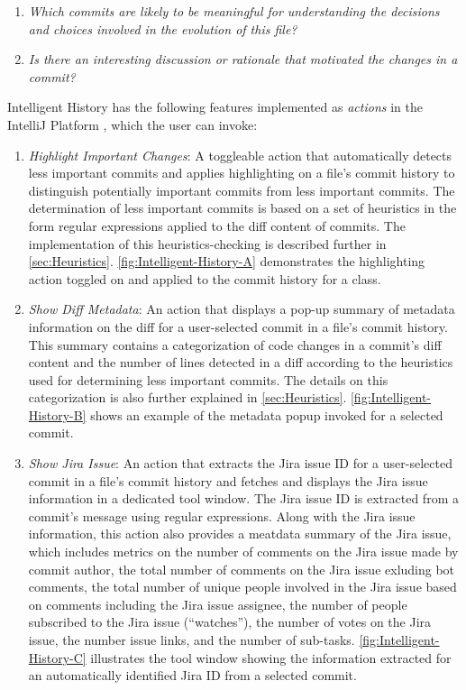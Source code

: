 \begin{enumerate}[label={(\arabic*)}]
    \item \textit{Which commits are likely to be meaningful for understanding the decisions and choices involved in the evolution of this file?}
    \item \textit{Is there an interesting discussion or rationale that motivated the changes in a commit?}
\end{enumerate}

Intelligent History has the following features implemented as \emph{actions} in the IntelliJ Platform , which the user can invoke:

\begin{enumerate}[label=(\Alph*)]
    \item \textit{Highlight Important Changes}: A toggleable action that automatically detects less important commits and applies highlighting on a file's commit history to distinguish potentially important commits from less important commits. The determination of less important commits is based on a set of heuristics in the form regular expressions applied to the diff content of commits. The implementation of this heuristics-checking is described further in \autoref{sec:Heuristics}. \autoref{fig:Intelligent-History-A} demonstrates the highlighting action toggled on and applied to the commit history for a class.
    \item \textit{Show Diff Metadata}: An action that displays a pop-up summary of metadata information on the diff for a user-selected commit in a file's commit history. This summary contains a categorization of code changes in a commit's diff content and the number of lines detected in a diff according to the heuristics used for determining less important commits. The details on this categorization is also further explained in \autoref{sec:Heuristics}. \autoref{fig:Intelligent-History-B} shows an example of the metadata popup invoked for a selected commit.
    \item \textit{Show Jira Issue}: An action that extracts the Jira issue ID for a user-selected commit in a file's commit history and fetches and displays the Jira issue information in a dedicated tool window. The Jira issue ID is extracted from a commit's message using regular expressions. Along with the Jira issue information, this action also provides a meatdata summary of the Jira issue, which includes metrics on the number of comments on the Jira issue made by commit author, the total number of comments on the Jira issue exluding bot comments, the total number of unique people involved in the Jira issue based on comments including the Jira issue assignee, the number of people subscribed to the Jira issue (``watches''), the number of votes on the Jira issue, the number issue links, and the number of sub-tasks. \autoref{fig:Intelligent-History-C} illustrates the tool window showing the information extracted for an automatically identified Jira ID from a selected commit.
\end{enumerate}

